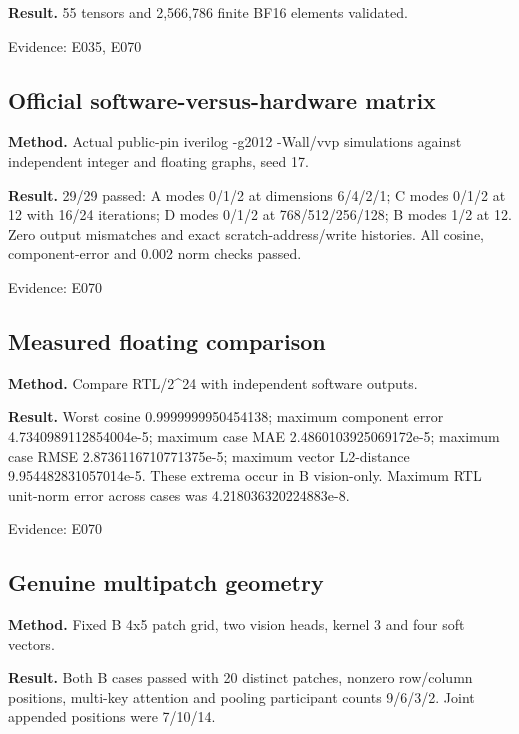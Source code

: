 \documentclass[11pt,a4paper]{article}
\begin{document}
\textbf{Result.} 55 tensors and 2,\allowbreak{}566,\allowbreak{}786 finite BF16 elements validated.

{\small Evidence: E035,\allowbreak{} E070}

\subsection{Official software-versus-hardware matrix}

\textbf{Method.} Actual public-pin iverilog -g2012 -Wall/\allowbreak{}vvp simulations against independent integer and floating graphs,\allowbreak{} seed 17.

\textbf{Result.} 29/\allowbreak{}29 passed: A modes 0/\allowbreak{}1/\allowbreak{}2 at dimensions 6/\allowbreak{}4/\allowbreak{}2/\allowbreak{}1; C modes 0/\allowbreak{}1/\allowbreak{}2 at 12 with 16/\allowbreak{}24 iterations; D modes 0/\allowbreak{}1/\allowbreak{}2 at 768/\allowbreak{}512/\allowbreak{}256/\allowbreak{}128; B modes 1/\allowbreak{}2 at 12. Zero output mismatches and exact scratch-address/\allowbreak{}write histories. All cosine,\allowbreak{} component-error and 0.002 norm checks passed.

{\small Evidence: E070}

\subsection{Measured floating comparison}

\textbf{Method.} Compare RTL/\allowbreak{}2\textasciicircum{}24 with independent software outputs.

\textbf{Result.} Worst cosine 0.9999999950454138; maximum component error 4.7340989112854004e-5; maximum case MAE 2.4860103925069172e-5; maximum case RMSE 2.8736116710771375e-5; maximum vector L2-distance 9.954482831057014e-5. These extrema occur in B vision-only. Maximum RTL unit-norm error across cases was 4.218036320224883e-8.

{\small Evidence: E070}

\subsection{Genuine multipatch geometry}

\textbf{Method.} Fixed B 4x5 patch grid,\allowbreak{} two vision heads,\allowbreak{} kernel 3 and four soft vectors.

\textbf{Result.} Both B cases passed with 20 distinct patches,\allowbreak{} nonzero row/\allowbreak{}column positions,\allowbreak{} multi-key attention and pooling participant counts 9/\allowbreak{}6/\allowbreak{}3/\allowbreak{}2. Joint appended positions were 7/\allowbreak{}10/\allowbreak{}14.
\end{document}
